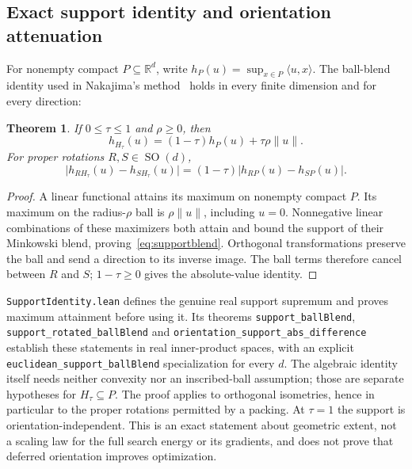 \documentclass[11pt,a4paper]{article}
\newcommand{\R}{\mathbb R}
\newcommand{\SO}{\operatorname{SO}}
\newcommand{\code}[1]{\texttt{\nolinkurl{#1}}}
\newtheorem{theorem}{Theorem}
\begin{document}
\subsection{Exact support identity and orientation attenuation}\label{sec:supportidentity}
For nonempty compact $P\subseteq\R^d$, write
$h_P(u)=\sup_{x\in P}\langle u,x\rangle$.
The ball-blend identity used in Nakajima's method~\cite[Section 3]{nakajima2026}
holds in every finite dimension and for every direction:
\begin{theorem}\label{thm:supportblend}
If $0\leq\tau\leq1$ and $\rho\geq0$, then
\begin{equation}\label{eq:supportblend}
h_{H_\tau}(u)=(1-\tau)h_P(u)+\tau\rho\|u\|.
\end{equation}
For proper rotations $R,S\in\SO(d)$,
\begin{equation}\label{eq:orientationattenuation}
\big|h_{R H_\tau}(u)-h_{S H_\tau}(u)\big|
=(1-\tau)\big|h_{RP}(u)-h_{SP}(u)\big|.
\end{equation}
\end{theorem}
\begin{proof}
A linear functional attains its maximum on nonempty compact $P$. Its maximum
on the radius-$\rho$ ball is $\rho\|u\|$, including $u=0$. Nonnegative linear
combinations of these maximizers both attain and bound the support of their
Minkowski blend, proving~\eqref{eq:supportblend}. Orthogonal transformations
preserve the ball and send a direction to its inverse image. The ball terms
therefore cancel between $R$ and $S$; $1-\tau\geq0$ gives the absolute-value identity.
\end{proof}

\code{SupportIdentity.lean} defines the genuine real support supremum and
proves maximum attainment before using it. Its theorems
\code{support_ballBlend}, \code{support_rotated_ballBlend} and
\code{orientation_support_abs_difference} establish these statements in real
inner-product spaces, with an explicit \code{euclidean_support_ballBlend}
specialization for every $d$. The algebraic identity itself needs neither
convexity nor an inscribed-ball assumption; those are separate hypotheses for
$H_\tau\subseteq P$. The proof applies to orthogonal isometries, hence in
particular to the proper rotations permitted by a packing. At $\tau=1$ the
support is orientation-independent. This is an exact statement about geometric
extent, not a scaling law for the full search energy or its gradients, and does
not prove that deferred orientation improves optimization.
\end{document}
